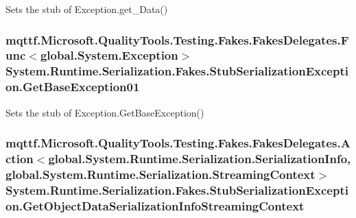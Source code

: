 Sets the stub of Exception.\-get\-\_\-\-Data()

\hypertarget{class_system_1_1_runtime_1_1_serialization_1_1_fakes_1_1_stub_serialization_exception_a56f355203140f7313c14373849ed1b5b}{
\subsubsection[{Get\-Base\-Exception01}]{\setlength{\rightskip}{0pt plus 5cm}mqttf.\-Microsoft.\-Quality\-Tools.\-Testing.\-Fakes.\-Fakes\-Delegates.\-Func$<$global.\-System.\-Exception$>$ System.\-Runtime.\-Serialization.\-Fakes.\-Stub\-Serialization\-Exception.\-Get\-Base\-Exception01}}\label{class_system_1_1_runtime_1_1_serialization_1_1_fakes_1_1_stub_serialization_exception_a56f355203140f7313c14373849ed1b5b}


Sets the stub of Exception.\-Get\-Base\-Exception()

\hypertarget{class_system_1_1_runtime_1_1_serialization_1_1_fakes_1_1_stub_serialization_exception_a87fa5c3944505d1c6884198de814ef07}{
\subsubsection[{Get\-Object\-Data\-Serialization\-Info\-Streaming\-Context}]{\setlength{\rightskip}{0pt plus 5cm}mqttf.\-Microsoft.\-Quality\-Tools.\-Testing.\-Fakes.\-Fakes\-Delegates.\-Action$<$global.\-System.\-Runtime.\-Serialization.\-Serialization\-Info, global.\-System.\-Runtime.\-Serialization.\-Streaming\-Context$>$ System.\-Runtime.\-Serialization.\-Fakes.\-Stub\-Serialization\-Exception.\-Get\-Object\-Data\-Serialization\-Info\-Streaming\-Context}}\label{class_system_1_1_runtime_1_1_serialization_1_1_fakes_1_1_stub_serialization_exception_a87fa5c3944505d1c6884198de814ef07}


